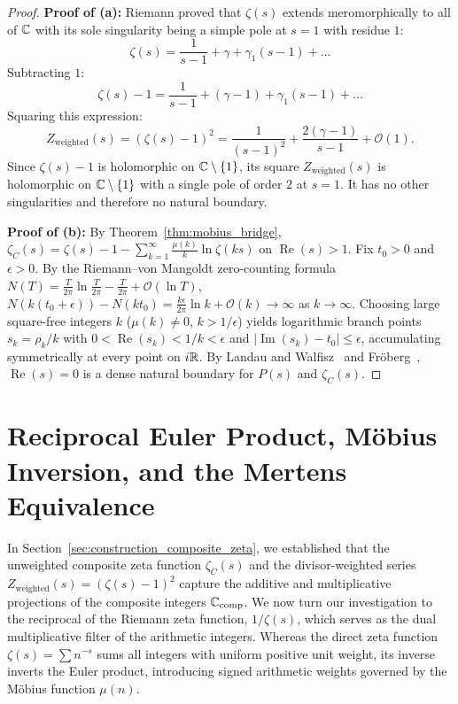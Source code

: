 \begin{proof}
\leanok
\textbf{Proof of (a):} Riemann proved that $\zeta(s)$ extends meromorphically to all of $\mathbb{C}$ with its sole singularity being a simple pole at $s = 1$ with residue $1$:
$$\zeta(s) = \frac{1}{s-1} + \gamma + \gamma_1(s-1) + \dots$$
Subtracting $1$:
$$\zeta(s) - 1 = \frac{1}{s-1} + (\gamma - 1) + \gamma_1(s-1) + \dots$$
Squaring this expression:
$$Z_{\mathrm{weighted}}(s) = (\zeta(s) - 1)^2 = \frac{1}{(s-1)^2} + \frac{2(\gamma - 1)}{s-1} + \mathcal{O}(1).$$
Since $\zeta(s) - 1$ is holomorphic on $\mathbb{C} \setminus \{1\}$, its square $Z_{\mathrm{weighted}}(s)$ is holomorphic on $\mathbb{C} \setminus \{1\}$ with a single pole of order $2$ at $s = 1$. It has no other singularities and therefore no natural boundary.

\textbf{Proof of (b):} By Theorem~\ref{thm:mobius_bridge}, $\zeta_C(s) = \zeta(s) - 1 - \sum_{k=1}^\infty \frac{\mu(k)}{k}\ln\zeta(ks)$ on $\operatorname{Re}(s) > 1$. Fix $t_0 > 0$ and $\epsilon > 0$. By the Riemann--von Mangoldt zero-counting formula $N(T) = \frac{T}{2\pi}\ln\frac{T}{2\pi} - \frac{T}{2\pi} + \mathcal{O}(\ln T)$, $N(k(t_0+\epsilon)) - N(k t_0) = \frac{k\epsilon}{2\pi}\ln k + \mathcal{O}(k) \to \infty$ as $k \to \infty$. Choosing large square-free integers $k$ ($\mu(k) \neq 0$, $k > 1/\epsilon$) yields logarithmic branch points $s_k = \rho_k / k$ with $0 < \operatorname{Re}(s_k) < 1/k < \epsilon$ and $|\operatorname{Im}(s_k) - t_0| \le \epsilon$, accumulating symmetrically at every point on $i\mathbb{R}$. By Landau and Walfisz~\cite{LandauWalfisz1920} and Fr\"oberg~\cite{Froberg1968}, $\operatorname{Re}(s) = 0$ is a dense natural boundary for $P(s)$ and $\zeta_C(s)$.
\end{proof}


\section{Reciprocal Euler Product, M\"obius Inversion, and the Mertens Equivalence}
\label{sec:reciprocal_euler_mertens}

In Section~\ref{sec:construction_composite_zeta}, we established that the unweighted composite zeta function $\zeta_C(s)$ and the divisor-weighted series $Z_{\mathrm{weighted}}(s) = (\zeta(s) - 1)^2$ capture the additive and multiplicative projections of the composite integers $\mathbb{C}_{\mathrm{comp}}$. We now turn our investigation to the reciprocal of the Riemann zeta function, $1/\zeta(s)$, which serves as the dual multiplicative filter of the arithmetic integers. Whereas the direct zeta function $\zeta(s) = \sum n^{-s}$ sums all integers with uniform positive unit weight, its inverse inverts the Euler product, introducing signed arithmetic weights governed by the M\"obius function $\mu(n)$.

